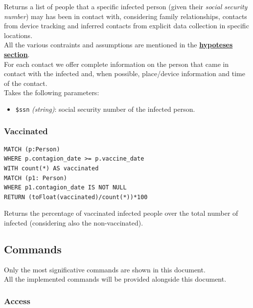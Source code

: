 \documentclass[12pt, a4paper]{article}
\begin{document}
\noindent %
Returns a list of people that a specific infected person (given their 
\emph{social security number}) may has been in contact with, considering 
family relationships, contacts from device tracking and inferred contacts from
explicit data collection in specific locations. \\
All the various contraints and assumptions are mentioned in the 
\hyperref[sec:Hypoteses]{\bf hypoteses section}. \\
For each contact we offer complete information on the person that came in 
contact with the infected and, when possible, place/device information and 
time of the contact. \\
Takes the following parameters: 
\begin{itemize}
    \item \texttt{\$ssn} \emph{(string)}: social security number of the 
        infected person.
\end{itemize}

\subsubsection{Vaccinated}

\begin{tcolorbox}[fontupper=\scriptsize]
    \begin{verbatim}
MATCH (p:Person)
WHERE p.contagion_date >= p.vaccine_date
WITH count(*) AS vaccinated
MATCH (p1: Person)
WHERE p1.contagion_date IS NOT NULL
RETURN (toFloat(vaccinated)/count(*))*100
    \end{verbatim}
\end{tcolorbox}

\noindent %
Returns the percentage of vaccinated infected people over the total 
number of infected (considering also the non-vaccinated).


\subsection{Commands}

Only the most significative commands are shown in this document. \\
All the implemented commands will be provided alongside this document.

\subsubsection{Access}
\end{document}
